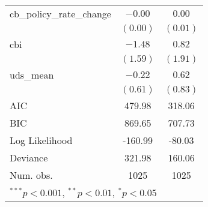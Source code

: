 \begin{tabular}{l c c }
cb\_policy\_rate\_change        & $-0.00$       & $0.00$     \\
                                & $(0.00)$      & $(0.01)$   \\
cbi                             & $-1.48$       & $0.82$     \\
                                & $(1.59)$      & $(1.91)$   \\
uds\_mean                       & $-0.22$       & $0.62$     \\
                                & $(0.61)$      & $(0.83)$   \\
\hline
AIC                             & 479.98        & 318.06     \\
BIC                             & 869.65        & 707.73     \\
Log Likelihood                  & -160.99       & -80.03     \\
Deviance                        & 321.98        & 160.06     \\
Num. obs.                       & 1025          & 1025       \\
\hline
\multicolumn{3}{l}{\scriptsize{$^{***}p<0.001$, $^{**}p<0.01$, $^*p<0.05$}}
\end{tabular}
